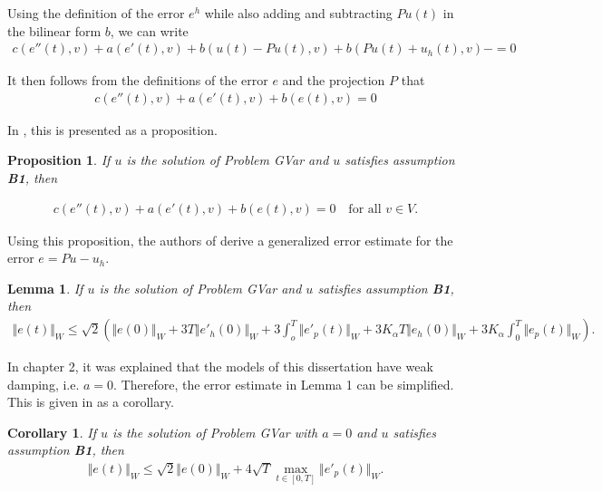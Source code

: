 \documentclass[../../main.tex]{subfiles}
\begin{document}
Using the definition of the error $e^h$ while also adding and subtracting $Pu(t)$ in the bilinear form $b$, we can write
\begin{eqnarray*}
	c(e''(t),v) + a(e'(t),v) + b(u(t) - Pu(t),v) + b(Pu(t) +u_h(t),v)- = 0
\end{eqnarray*}

It then follows from the definitions of the error $e$ and the projection $P$ that 
\begin{eqnarray*}
	c(e''(t),v) + a(e'(t),v) + b(e(t),v) = 0
\end{eqnarray*}

In \cite{BV13}, this is presented as a proposition.
\newtheorem{DC_Prop1}{Proposition}
\begin{DC_Prop1}
	If $u$ is the solution of Problem GVar and $u$ satisfies assumption \textbf{B1}, then

	\begin{eqnarray}
		c(e''(t),v) + a(e'(t),v) + b(e(t),v) = 0 \ \ \ \textrm{ for all } v \in V.
	\end{eqnarray}
\end{DC_Prop1}

Using this proposition, the authors of \cite{BV13} derive a generalized error estimate for the error $e = Pu - u_h$.

\newtheorem{lem_1}{Lemma}
\begin{lem_1}
	If $u$ is the solution of Problem GVar and $u$ satisfies assumption \textbf{B1}, then
	\begin{eqnarray}
		\Vert e(t)\Vert_{W} \leq \sqrt{2} \left( \Vert e(0) \Vert_W + 3T\Vert e'_h(0) \Vert_W + 3 \int_o^T \Vert e'_p(t)\Vert_W + 3K_\alpha T \Vert e_h(0) \Vert_W + 3K_\alpha \int_0^T \Vert e_p(t) \Vert_W \right).
	\end{eqnarray}
\end{lem_1}

In chapter 2, it was explained that the models of this dissertation have weak damping, i.e. $a = 0$. Therefore, the error estimate in Lemma 1 can be simplified. This is given in \cite{BV13} as a corollary.

\newtheorem{col_1}{Corollary}
\begin{col_1}
	If $u$ is the solution of Problem GVar with $a = 0$ and $u$ satisfies assumption \textbf{B1}, then
	\begin{eqnarray}
		\Vert e(t)\Vert_{W} \leq \sqrt{2} \Vert e(0) \Vert_W + 4\sqrt{T}\max_{t \in [0,T]} \Vert e'_p(t) \Vert_W.
	\end{eqnarray}
\end{col_1}
\end{document}
